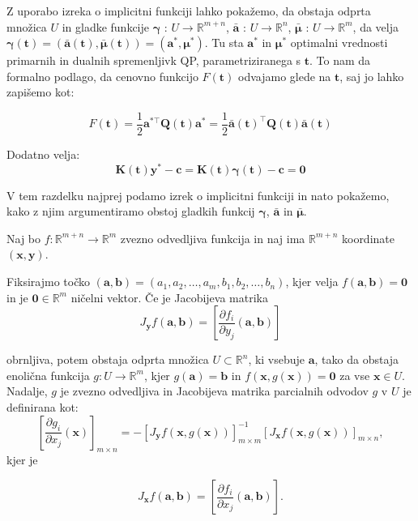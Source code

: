 \documentclass[isrm2, tisk]{fmfdelo}
\newcommand{\R}{\mathbb R}
\newcommand{\aimplicit}{\bar{\mathbf{a}}}
\newcommand{\muimplicit}{\bar{\boldsymbol{\mu}}}
\newcommand{\yimplicit}{\mathbf{\gamma}}
\newcommand{\qmat}{\mathbf{Q}}
\newcommand{\kmat}{\mathbf{K}}
\newcommand{\avec}{\mathbf{a}}
\newcommand{\tvec}{\mathbf{t}}
\newcommand{\muvec}{\boldsymbol{\mu}}
\begin{document}
Z uporabo izreka o implicitni funkciji lahko pokažemo, da obstaja odprta množica $U$ in gladke funkcije $\yimplicit$ : $U \to \R^{m+n}$, $\aimplicit$ : $U \to \R^{n}$, $\muimplicit$ : $U \to \R^{m}$, da velja $\yimplicit(\tvec) = (\aimplicit(\tvec), \muimplicit(\tvec)) = (\avec^*, \muvec^*)$. Tu sta $\avec^*$ in $\muvec^*$ optimalni vrednosti primarnih in dualnih spremenljivk \ac{QP}, parametriziranega s $\tvec$. To nam da formalno podlago, da cenovno funkcijo $F(\tvec)$ odvajamo glede na $\tvec$, saj jo lahko zapišemo kot:

\begin{equation}
    \label{eq:cost_function_implicit}
    F(\mathbf{t}) = \frac{1}{2}\avec^{*\top}\qmat(\tvec)\avec^* = \frac{1}{2} \aimplicit(\tvec)^\top \qmat(\tvec) \aimplicit(\tvec)
\end{equation}

Dodatno velja:
\begin{equation}
    \label{eq:equilibrium_implicit}
    \kmat(\tvec) \mathbf{y}^* - \mathbf{c} = \kmat(\tvec) \yimplicit(\tvec) - \mathbf{c} = \mathbf{0}
\end{equation}

V tem razdelku najprej podamo izrek o implicitni funkciji \cite{krantz2002implicit} in nato pokažemo, kako z njim argumentiramo obstoj gladkih funkcij $\yimplicit$, $\aimplicit$ in $\muimplicit$.

\begin{izrek}
    Naj bo $f: \mathbb{R}^{m+n} \to \mathbb{R}^m$ zvezno odvedljiva funkcija in naj ima $\mathbb{R}^{m+n}$ koordinate $(\mathbf{x},\mathbf{y})$. 
    
    Fiksirajmo točko $(\mathbf{a}, \mathbf{b}) = (a_1, a_2, \ldots, a_m, b_1, b_2, \ldots, b_n)$, kjer velja $f(\mathbf{a},\mathbf{b}) = \mathbf{0}$ in je $\mathbf{0} \in \mathbb{R}^m$ ničelni vektor. Če je Jacobijeva matrika
    \begin{equation}
        J_\mathbf{y}f(\mathbf{a}, \mathbf{b}) = \left[ \frac{\partial f_i}{\partial y_j} (\mathbf{a},\mathbf{b})\right]
    \end{equation}

    \noindent obrnljiva, potem obstaja odprta množica $U \subset \mathbb{R}^n$, ki vsebuje $\mathbf{a}$, tako da obstaja enolična funkcija $g:U \to \mathbb{R}^m$, kjer $g(\mathbf{a}) = \mathbf{b}$ in $f(\mathbf{x}, g(\mathbf{x})) = \mathbf{0}$ za vse $\mathbf{x} \in U$. Nadalje, $g$ je zvezno odvedljiva in Jacobijeva matrika parcialnih odvodov $g$ v $U$ je definirana kot:
    \begin{equation}
        \left[\frac{\partial g_i}{\partial x_j}(\mathbf{x})\right]_{m \times n}
= -\left[ J_\mathbf{y}f(\mathbf{x}, g(\mathbf{x})) \right]^{-1}_{m \times m}
\left[ J_\mathbf{x}f(\mathbf{x}, g(\mathbf{x})) \right]_{m \times n},
    \end{equation} kjer je 

\begin{equation}
        J_\mathbf{x}f(\mathbf{a}, \mathbf{b}) = \left[ \frac{\partial f_i}{\partial x_j} (\mathbf{a},\mathbf{b})\right].
    \end{equation}
\end{izrek}
\end{document}
